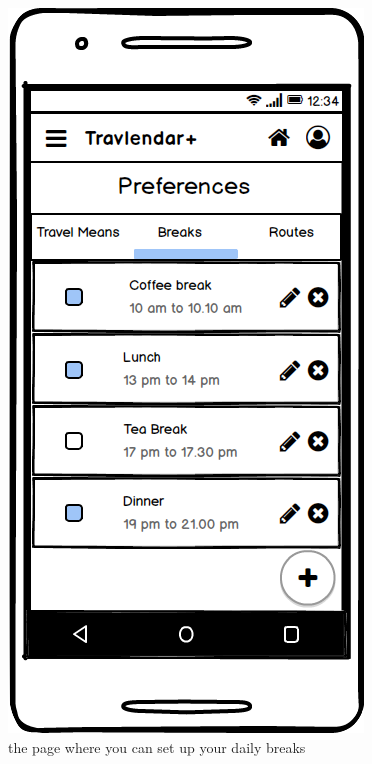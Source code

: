 \documentclass[11pt]{article}
\begin{document}
		\begin{figure}
		\centering
		\includegraphics[width=0.7\linewidth]{PreferencesBreaks.png}
		\caption{the page where you can set up your daily breaks}
		\label{fig:preferencesbreaks}
	\end{figure}
	
\end{document}
